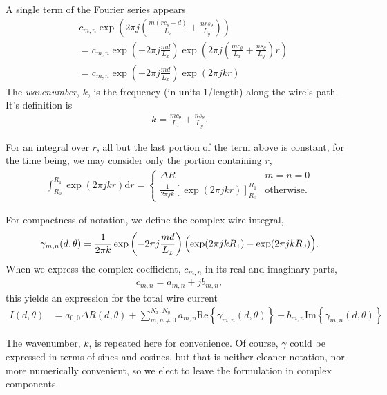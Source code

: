 \documentclass{article}
\def\d{\mathrm{d}}
\def\real{\mathrm{Re}}
\def\imag{\mathrm{Im}}
\begin{document}
A single term of the Fourier series appears
\begin{align*}
&c_{m,n} \exp\left(2\pi j \left( \frac{m(r c_\theta - d)}{L_x} + \frac{n r s_\theta}{L_y} \right)\right)\\
&= c_{m,n} \exp\left(-2\pi j \frac{md}{L_x} \right) \exp\left(2\pi j \left( \frac{m c_\theta}{L_x} + \frac{n s_\theta}{L_y} \right) r\right)\\
&= c_{m,n} \exp\left(-2\pi j \frac{md}{L_x} \right) \exp\left(2\pi j k r \right)
\end{align*}
The \emph{wavenumber}, $k$, is the frequency (in units 1/length) along the wire's path.  It's definition is
\begin{align}
k = \frac{m c_\theta}{L_x} + \frac{n s_\theta}{L_y}.
\end{align}

For an integral over $r$, all but the last portion of the term above is constant, for the time being, we may consider only the portion containing $r$,
\begin{align}
\int_{R_0}^{R_1} \exp\left(2\pi j k r \right) \d r = \left\{\begin{array}{c|l}
 \Delta R & m = n = 0\\
 \frac{1}{2\pi j k}\left[\exp\left(2\pi j k r \right)\right]^{R_1}_{R_0} & \mathrm{otherwise}.
\end{array}
\right.
\end{align}

For compactness of notation, we define the complex wire integral,
\begin{align}
\gamma_{m,n}(d,\theta) = \frac{1}{2\pi k}\exp\left(-2\pi j \frac{md}{L_x}\right) \Bigl( \exp(2\pi j k R_1) - \exp(2\pi j k R_0) \Bigr).
\end{align}
When we express the complex coefficient, $c_{m,n}$ in its real and imaginary parts,
\begin{align}
c_{m,n} = a_{m,n} + j b_{m,n},
\end{align}
this yields an expression for the total wire current
\begin{align}
I(d,\theta) &= a_{0,0} \Delta R(d,\theta) + \sum_{m,n\ne 0}^{N_x,N_y} a_{m,n} \real \left\{ \gamma_{m,n}(d,\theta) \right\} - b_{m,n} \imag \left\{ \gamma_{m,n}(d,\theta) \right\}
\end{align}

The wavenumber, $k$, is repeated here for convenience.  Of course, $\gamma$ could be expressed in terms of sines and cosines, but that is neither cleaner notation, nor more numerically convenient, so we elect to leave the formulation in complex components.
\end{document}
